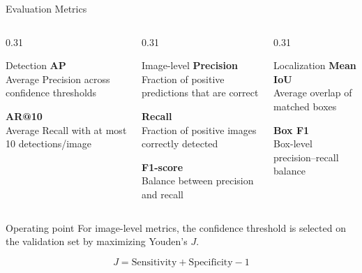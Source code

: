 \documentclass[aspectratio=169,11pt]{beamer}
\begin{document}
\begin{frame}{Evaluation Metrics}

\begin{columns}[t]

\begin{column}{0.31\textwidth}

\begin{block}{Detection}
\small
\textbf{AP}\\
Average Precision across confidence thresholds

\vspace{0.15cm}

\textbf{AR@10}\\
Average Recall with at most 10 detections/image
\end{block}

\end{column}

\begin{column}{0.31\textwidth}

\begin{block}{Image-level}
\small
\textbf{Precision}\\
Fraction of positive predictions that are correct

\vspace{0.1cm}

\textbf{Recall}\\
Fraction of positive images correctly detected

\vspace{0.1cm}

\textbf{F1-score}\\
Balance between precision and recall
\end{block}

\end{column}

\begin{column}{0.31\textwidth}

\begin{block}{Localization}
\small
\textbf{Mean IoU}\\
Average overlap of matched boxes

\vspace{0.1cm}

\textbf{Box F1}\\
Box-level precision--recall balance
\end{block}

\end{column}

\end{columns}

\vspace{0.4cm}

\begin{alertblock}{Operating point}
\centering
\small
For image-level metrics, the confidence threshold is selected on the
validation set by maximizing Youden's $J$.
\end{alertblock}

\vspace{0.1cm}

\centering
\[
J = \mathrm{Sensitivity}+\mathrm{Specificity}-1
\]

\end{frame}
\end{document}
